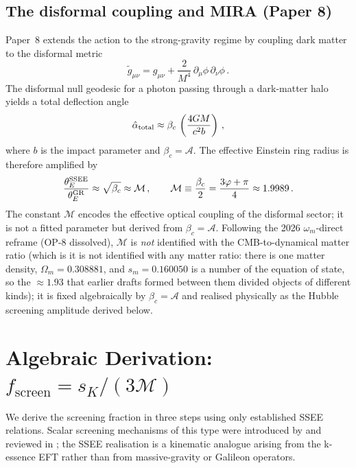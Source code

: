 \documentclass[12pt,a4paper]{article}
\newcommand{\phiG}{\varphi}
\newcommand{\MIRA}{\mathcal{M}}
\newcommand{\AURA}{\mathcal{A}}
\newcommand{\bc}{\beta_c}
\newcommand{\fsc}{f_{\mathrm{screen}}}
\newcommand{\sK}{s_K}          %
\renewcommand{\Omega}{\varOmega}
\begin{document}
\subsection{The disformal coupling and MIRA (Paper 8)}
\label{sec:p8recap}

Paper~8 extends the action to the strong-gravity regime by coupling dark
matter to the disformal metric \citep{Bekenstein1993,Zumalacarregui2014}
\begin{equation}
  \tilde{g}_{\mu\nu} = g_{\mu\nu} + \frac{2}{M^4}\,\partial_\mu\phi\,\partial_\nu\phi\,.
  \label{eq:disformal}
\end{equation}
The disformal null geodesic for a photon passing through a dark-matter halo
yields a total deflection angle
\begin{equation}
  \hat\alpha_{\rm total} \approx \bc\,\left(\frac{4GM}{c^2 b}\right)\,,
  \label{eq:deflection}
\end{equation}
where $b$ is the impact parameter and $\bc = \AURA$.
The effective Einstein ring radius is therefore amplified by
\begin{equation}
  \frac{\theta_E^{\rm SSEE}}{\theta_E^{\rm GR}} \approx \sqrt{\bc} \approx \MIRA\,,
  \qquad
  \MIRA \equiv \frac{\bc}{2} = \frac{3\phiG+\pi}{4} \approx 1.9989\,.
  \label{eq:MIRA_def}
\end{equation}
The constant $\MIRA$ encodes the effective optical coupling of the disformal
sector; it is not a fitted parameter but derived from $\bc = \AURA$.
Following the 2026 $\omega_m$-direct reframe (OP-8 dissolved), $\MIRA$ is
\emph{not} identified with the CMB-to-dynamical matter ratio (which is
it is not identified with any matter ratio: there is one matter density,
$\Omega_m=0.308881$, and $s_m=0.160050$ is a number of the equation of state,
so the $\approx1.93$ that earlier drafts formed between them divided objects of
different kinds);
it is fixed algebraically by $\bc=\AURA$ and realised physically as the
Hubble screening amplitude derived below.

\section{Algebraic Derivation: $\fsc = \sK/(3\MIRA)$}
\label{sec:identity}

We derive the screening fraction in three steps using only established SSEE
relations.  Scalar screening mechanisms of this type were introduced by
\citet{Vainshtein1972} and reviewed in \citet{Babichev2013}; the SSEE
realisation is a kinematic analogue arising from the k-essence EFT rather
than from massive-gravity or Galileon operators.
\end{document}
